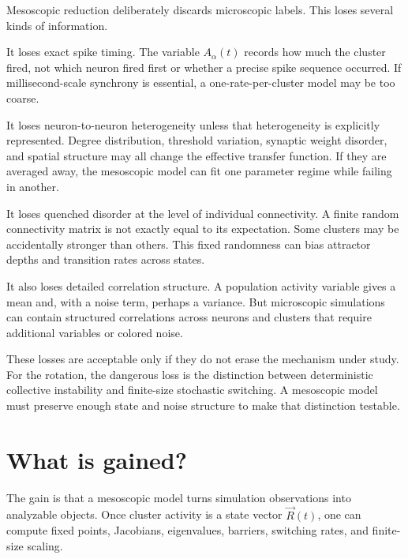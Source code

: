 Mesoscopic reduction deliberately discards microscopic labels. This loses several kinds of information.

It loses exact spike timing. The variable $A_\alpha(t)$ records how much the cluster fired, not which neuron fired first or whether a precise spike sequence occurred. If millisecond-scale synchrony is essential, a one-rate-per-cluster model may be too coarse.

It loses neuron-to-neuron heterogeneity unless that heterogeneity is explicitly represented. Degree distribution, threshold variation, synaptic weight disorder, and spatial structure may all change the effective transfer function. If they are averaged away, the mesoscopic model can fit one parameter regime while failing in another.

It loses quenched disorder at the level of individual connectivity. A finite random connectivity matrix is not exactly equal to its expectation. Some clusters may be accidentally stronger than others. This fixed randomness can bias attractor depths and transition rates across states.

It also loses detailed correlation structure. A population activity variable gives a mean and, with a noise term, perhaps a variance. But microscopic simulations can contain structured correlations across neurons and clusters that require additional variables or colored noise.

These losses are acceptable only if they do not erase the mechanism under study. For the rotation, the dangerous loss is the distinction between deterministic collective instability and finite-size stochastic switching. A mesoscopic model must preserve enough state and noise structure to make that distinction testable.

\section{What is gained?}
\label{sec:what-is-gained-mesoscopic}

The gain is that a mesoscopic model turns simulation observations into analyzable objects. Once cluster activity is a state vector $\vec R(t)$, one can compute fixed points, Jacobians, eigenvalues, barriers, switching rates, and finite-size scaling.

